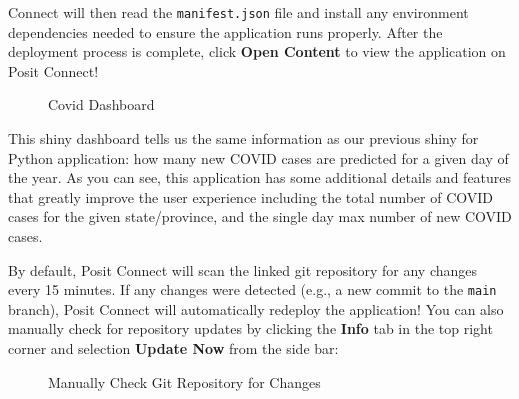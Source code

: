 \documentclass[
  letterpaper,
  DIV=11,
  numbers=noendperiod]{scrreprt}
\begin{document}
Connect will then read the \texttt{manifest.json} file and install any
environment dependencies needed to ensure the application runs properly.
After the deployment process is complete, click \textbf{Open Content} to
view the application on Posit Connect!

\begin{figure}


\caption{\label{fig-covid-dashboard}Covid Dashboard}

\end{figure}%

This shiny dashboard tells us the same information as our previous shiny
for Python application: how many new COVID cases are predicted for a
given day of the year. As you can see, this application has some
additional details and features that greatly improve the user experience
including the total number of COVID cases for the given state/province,
and the single day max number of new COVID cases.

By default, Posit Connect will scan the linked git repository for any
changes every 15 minutes. If any changes were detected (e.g., a new
commit to the \texttt{main} branch), Posit Connect will automatically
redeploy the application! You can also manually check for repository
updates by clicking the \textbf{Info} tab in the top right corner and
selection \textbf{Update Now} from the side bar:

\begin{figure}


\caption{\label{fig-update-content}Manually Check Git Repository for
Changes}

\end{figure}%
\end{document}
